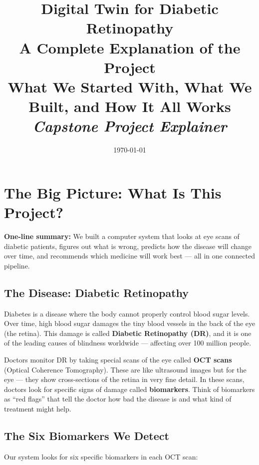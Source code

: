 \documentclass[12pt,a4paper]{article}
\title{%
  \vspace{-1cm}
  {\LARGE\bfseries Digital Twin for Diabetic Retinopathy}\\[8pt]
  {\Large A Complete Explanation of the Project}\\[6pt]
  {\large What We Started With, What We Built, and How It All Works}\\[12pt]
  {\normalsize\itshape Capstone Project Explainer}
}
\author{}
\date{\today}
\begin{document}
\maketitle
\thispagestyle{fancy}

\tableofcontents
\newpage

\section{The Big Picture: What Is This Project?}

\begin{mdframed}[style=keypoint]
\textbf{One-line summary:} We built a computer system that looks at eye scans of diabetic patients, figures out what is wrong, predicts how the disease will change over time, and recommends which medicine will work best --- all in one connected pipeline.
\end{mdframed}

\subsection{The Disease: Diabetic Retinopathy}

Diabetes is a disease where the body cannot properly control blood sugar levels. Over time, high blood sugar damages the tiny blood vessels in the back of the eye (the retina). This damage is called \textbf{Diabetic Retinopathy (DR)}, and it is one of the leading causes of blindness worldwide --- affecting over 100 million people.

Doctors monitor DR by taking special scans of the eye called \textbf{OCT scans} (Optical Coherence Tomography). These are like ultrasound images but for the eye --- they show cross-sections of the retina in very fine detail. In these scans, doctors look for specific signs of damage called \textbf{biomarkers}. Think of biomarkers as ``red flags'' that tell the doctor how bad the disease is and what kind of treatment might help.

\subsection{The Six Biomarkers We Detect}

Our system looks for six specific biomarkers in each OCT scan:
\end{document}
